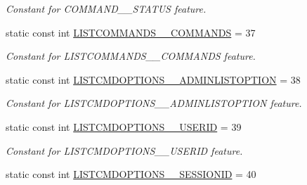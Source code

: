 \begin{DoxyCompactItemize}
\begin{DoxyCompactList}\small\item\em Constant for COMMAND\_\-\_\-STATUS feature. \item\end{DoxyCompactList}\item 
\hypertarget{classUMS__Data_1_1UMS__DataPackage_a284049156b3ebc76a697005e30d70340}{
static const int \hyperlink{classUMS__Data_1_1UMS__DataPackage_a284049156b3ebc76a697005e30d70340}{LISTCOMMANDS\_\-\_\-COMMANDS} = 37}
\label{classUMS__Data_1_1UMS__DataPackage_a284049156b3ebc76a697005e30d70340}

\begin{DoxyCompactList}\small\item\em Constant for LISTCOMMANDS\_\-\_\-COMMANDS feature. \item\end{DoxyCompactList}\item 
\hypertarget{classUMS__Data_1_1UMS__DataPackage_a5c43cdc8af5c4dcba493a110a3f1259d}{
static const int \hyperlink{classUMS__Data_1_1UMS__DataPackage_a5c43cdc8af5c4dcba493a110a3f1259d}{LISTCMDOPTIONS\_\-\_\-ADMINLISTOPTION} = 38}
\label{classUMS__Data_1_1UMS__DataPackage_a5c43cdc8af5c4dcba493a110a3f1259d}

\begin{DoxyCompactList}\small\item\em Constant for LISTCMDOPTIONS\_\-\_\-ADMINLISTOPTION feature. \item\end{DoxyCompactList}\item 
\hypertarget{classUMS__Data_1_1UMS__DataPackage_ae54a1479f452a43d3cb44c1cd236e9d0}{
static const int \hyperlink{classUMS__Data_1_1UMS__DataPackage_ae54a1479f452a43d3cb44c1cd236e9d0}{LISTCMDOPTIONS\_\-\_\-USERID} = 39}
\label{classUMS__Data_1_1UMS__DataPackage_ae54a1479f452a43d3cb44c1cd236e9d0}

\begin{DoxyCompactList}\small\item\em Constant for LISTCMDOPTIONS\_\-\_\-USERID feature. \item\end{DoxyCompactList}\item 
\hypertarget{classUMS__Data_1_1UMS__DataPackage_a2d82201bb26cd646cea7b5284a9ce6c8}{
static const int \hyperlink{classUMS__Data_1_1UMS__DataPackage_a2d82201bb26cd646cea7b5284a9ce6c8}{LISTCMDOPTIONS\_\-\_\-SESSIONID} = 40}
\label{classUMS__Data_1_1UMS__DataPackage_a2d82201bb26cd646cea7b5284a9ce6c8}


\end{DoxyCompactItemize}
